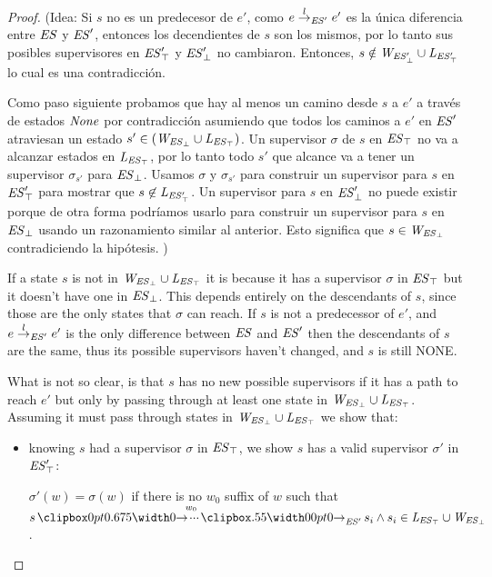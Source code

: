 \begin{proof}
	(Idea: Si $s$ no es un predecesor de $e'$, como $e \overset{l}{\rightarrow}_{\mathit{ES}'} e'$ es la única diferencia entre $\mathit{ES}$ y $\mathit{ES}'$, entonces los decendientes de $s$ son los mismos, 
	por lo tanto sus posibles supervisores en $\mathit{\mathit{ES}'_{\top}}$ y
	$\mathit{\mathit{ES}'_{\bot}}$ no cambiaron. Entonces, $s \notin \mathit{W_{\mathit{\mathit{ES}'_{\bot}}}} \cup 
	\mathit{L_{\mathit{\mathit{ES}'_{\top}}}}$ lo cual es una contradicción.
	
	Como paso siguiente probamos que hay al menos un camino desde $s$ a $e'$ a través de estados $\mathit{None}$ por contradicción asumiendo que todos los caminos a $e'$ en $\mathit{ES}'$ atraviesan un estado $s' \in 
	(\mathit{W_{\mathit{\mathit{ES}_{\bot}}}} \cup \mathit{L_{\mathit{\mathit{ES}_{\top}}}})$. Un supervisor $\sigma$ de $s$ en 
	$\mathit{\mathit{ES}_{\top}}$ no va a alcanzar estados en $\mathit{L_{\mathit{\mathit{ES}_{\top}}}}$, 
	por lo tanto todo $s'$ que alcance va a tener un supervisor $\sigma_{s'}$ para 
	$\mathit{\mathit{ES}_{\bot}}$. Usamos $\sigma$ y $\sigma_{s'}$ para construir un supervisor para $s$ en $\mathit{\mathit{ES}'_{\top}}$ para mostrar que $s 
	\not\in \mathit{L_{\mathit{\mathit{ES}'_{\top}}}}$.
	Un supervisor para $s$ en $\mathit{\mathit{ES}'_{\bot}}$ no puede existir porque de otra forma podríamos usarlo para construir un supervisor para $s$ en 
	$\mathit{\mathit{ES}_{\bot}}$ usando un razonamiento similar al anterior. Esto significa que $s \in 
	\mathit{W_{\mathit{\mathit{ES}_{\bot}}}}$ contradiciendo la hipótesis. )


If a state $s$ is not in $\mathit{W_{\mathit{\mathit{ES}_{\bot}}}} \cup \mathit{L_{\mathit{\mathit{ES}_{\top}}}}$ it is because it has a  supervisor $\sigma$ in $\mathit{\mathit{ES}_{\top}}$ but it doesn't have one in $\mathit{\mathit{ES}_{\bot}}$. This depends entirely on the descendants of $s$, since those are the only states that $\sigma$ can reach. If $s$ is not a predecessor of $e'$, and $e \overset{l}{\rightarrow}_{\mathit{ES}'} e'$ is the only difference between $\mathit{ES}$ and $\mathit{ES}'$ then the descendants of $s$ are the same, thus its possible supervisors haven't changed, and $s$ is still NONE.

What is not so clear, is that $s$ has no new possible supervisors if it has a path to reach $e'$ but only by passing through at least one state in $\mathit{W_{\mathit{\mathit{ES}_{\bot}}}} \cup \mathit{L_{\mathit{\mathit{ES}_{\top}}}}$. Assuming it must pass through states in $\mathit{W_{\mathit{\mathit{ES}_{\bot}}}} \cup \mathit{L_{\mathit{\mathit{ES}_{\top}}}}$ we show that:

\begin{itemize}
	\item knowing $s$ had a supervisor $\sigma$ in $\mathit{\mathit{ES}_{\top}}$, we show $s$ has a valid supervisor $\sigma'$ in $\mathit{\mathit{ES}'_{\top}}$:
	
	$\sigma'(w) = \sigma(w)$ if there is no $w_0$ suffix of $w$ such that $ s \runw{w_0}{\structure'} s_i \wedge s_i \in \LES \cup \WES$. 
	

\end{itemize}
\end{proof}
